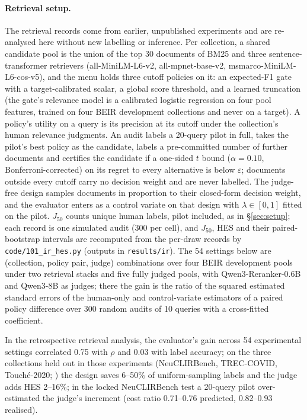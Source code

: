 \documentclass[11pt]{article}
\newcommand{\eps}{\varepsilon}
\newcommand{\Jt}{J_{50}}
\begin{document}
\paragraph{Retrieval setup.} The retrieval records come from earlier, unpublished experiments and are re-analysed
here without new labelling or inference. Per collection, a shared candidate pool is the union of the top 30 documents of
BM25 and three sentence-transformer retrievers (all-MiniLM-L6-v2, all-mpnet-base-v2, msmarco-MiniLM-L6-cos-v5), and the
menu holds three cutoff policies on it: an expected-F1 gate with a target-calibrated scalar, a global score threshold,
and a learned truncation (the gate's relevance model is a calibrated logistic regression on four pool features, trained
on four BEIR development collections and never on a target). A policy's utility on a query is its precision at its
cutoff under the collection's human relevance judgments. An audit labels a 20-query pilot in full, takes the pilot's
best policy as the candidate, labels a pre-committed number of further documents and certifies the candidate if a
one-sided $t$ bound ($\alpha=0.10$, Bonferroni-corrected) on its regret to every alternative is below $\eps$; documents outside every cutoff carry no decision
weight and are never labelled. The judge-free design samples documents in proportion to their closed-form decision
weight, and the evaluator enters as a control variate on that design with $\lambda\in[0,1]$ fitted on the pilot. $\Jt$ counts unique human labels,
pilot included, as in \S\ref{sec:setup}; each record is one simulated audit (300 per cell), and $\Jt$, HES and their
paired-bootstrap intervals are recomputed from the per-draw records by \texttt{code/101\_ir\_hes.py} (outputs in
\texttt{results/ir}). The 54 settings below are (collection, policy pair, judge) combinations over four BEIR development
pools under two retrieval stacks and five fully judged pools, with Qwen3-Reranker-0.6B and Qwen3-8B as judges; there the
gain is the ratio of the squared estimated standard errors of the human-only and control-variate estimators of a paired
policy difference over 300 random audits of 10 queries with a cross-fitted coefficient.

In the retrospective retrieval analysis, the evaluator's gain across 54 experimental settings correlated 0.75
with $\rho$ and 0.03 with label accuracy; on the three collections held out in those experiments (NeuCLIRBench, TREC-COVID, Touch\'e-2020;
\citealp{lawrie2025neuclirbench,voorhees2020treccovid,bondarenko2020touche}) the design saves 6--50\% of uniform-sampling
labels and the judge adds HES 2--16\%; in the locked NeuCLIRBench test a 20-query pilot over-estimated the judge's
increment (cost ratio 0.71--0.76 predicted, 0.82--0.93 realised).
\end{document}
